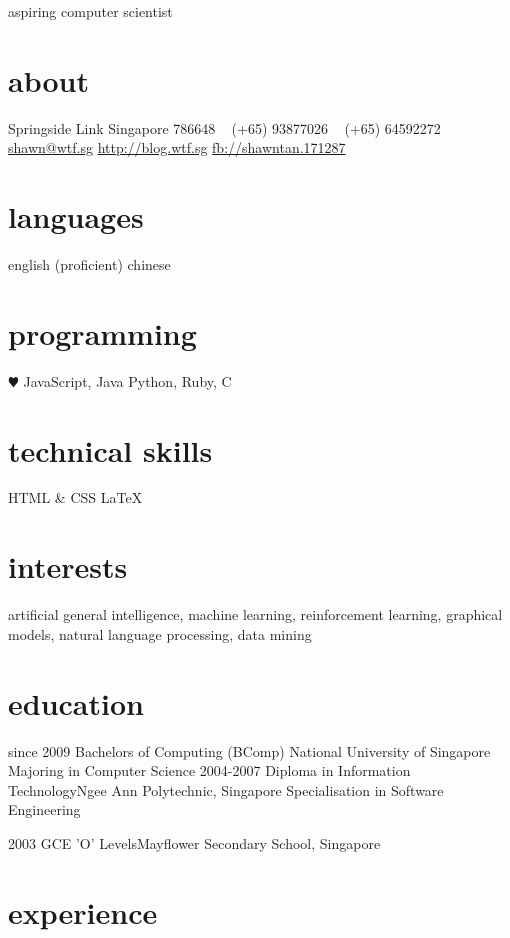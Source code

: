 \documentclass[]{friggeri-cv}
\begin{document}
{aspiring computer scientist}


\begin{aside}
	\section{about}
	 Springside Link
	Singapore 786648
	\Mobilefone~ (+65) 93877026
	\Telefon~ (+65) 64592272
	~
	\Email~ \href{mailto:shawn@wtf.sg}{shawn@wtf.sg}
	\href{http://blog.wtf.sg}{http://blog.wtf.sg}
	\href{http://facebook.com/shawntan.171287}{fb://shawntan.171287}
	\section{languages}
	english (proficient)
	chinese
	\section{programming}
	{\color{red} $\varheartsuit$} JavaScript, Java
	Python, Ruby, C
	\section{technical skills}
	HTML \& CSS
	\LaTeX
\end{aside}

\section{interests}

artificial general intelligence, machine learning, reinforcement learning, graphical models, natural language processing, data mining

\section{education}

\begin{entrylist}
	\entry
	{since 2009}
	{Bachelors of Computing (BComp)}
	{National University of Singapore}
	{Majoring in Computer Science}
	\entry
	{2004-2007}
	{Diploma in Information Technology}{Ngee Ann Polytechnic, Singapore}
	{Specialisation in Software Engineering}

	\entry
	{2003}
	{GCE 'O' Levels}{Mayflower Secondary School, Singapore}
	{}
\end{entrylist}

\section{experience}
\end{document}
